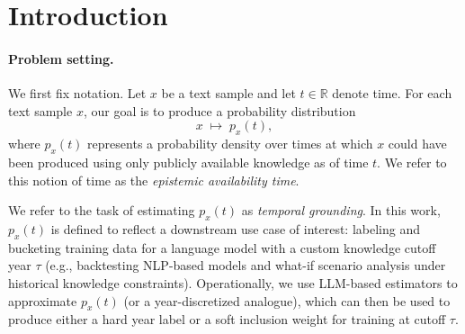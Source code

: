 \section{Introduction}
\paragraph{Problem setting.}
We first fix notation. Let $x$ be a text sample and let $t \in \mathbb{R}$ denote time.
For each text sample $x$, our goal is to produce a probability distribution
\[
x \;\mapsto\; p_x(t),
\]
where $p_x(t)$ represents a probability density over times at which $x$ could have been produced using only publicly available knowledge as of time $t$.
We refer to this notion of time as the \emph{epistemic availability time}.

We refer to the task of estimating $p_x(t)$ as \emph{temporal grounding}.
In this work, $p_x(t)$ is defined to reflect a downstream use case of interest: labeling and bucketing training data for a language model with a custom knowledge cutoff year $\tau$ (e.g., backtesting NLP-based models and what-if scenario analysis under historical knowledge constraints).
Operationally, we use LLM-based estimators to approximate $p_x(t)$ (or a year-discretized analogue), which can then be used to produce either a hard year label or a soft inclusion weight for training at cutoff $\tau$.

